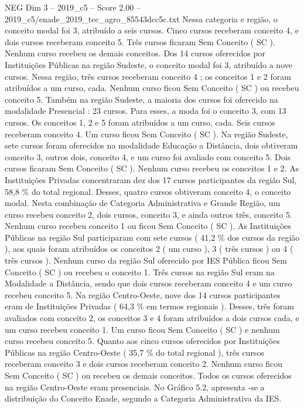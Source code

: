 \begin{textsample}{NEG Dim 3 – 2019\_c5 – Score 2.00 – 2019\_c5/enade\_2019\_tec\_agro\_85543dcc5c.txt}
Nessa categoria e região, o conceito modal foi 3, atribuído a seis cursos.
Cinco cursos receberam conceito 4, e dois cursos receberam conceito 5.
Três cursos ficaram Sem Conceito ( SC ).
Nenhum curso recebeu os demais conceitos.
Dos 14 cursos oferecidos por Instituições Públicas na região Sudeste, o conceito modal foi 3, atribuído a nove cursos.
Nessa região, três cursos receberam conceito 4 ; os conceitos 1 e 2 foram atribuídos a um curso, cada.
Nenhum curso ficou Sem Conceito ( SC ) ou recebeu conceito 5.
Também na região Sudeste, a maioria dos cursos foi oferecido na modalidade Presencial : 23 cursos.
Para esses, a moda foi o conceito 3, com 13 cursos.
Os conceitos 1, 2 e 5 foram atribuídos a um curso, cada.
Seis cursos receberam conceito 4.
Um curso ficou Sem Conceito ( SC ).
Na região Sudeste, sete cursos foram oferecidos na modalidade Educação a Distância, dois obtiveram conceito 3, outros dois, conceito 4, e um curso foi avaliado com conceito 5.
Dois cursos ficaram Sem Conceito ( SC ).
Nenhum curso recebeu os conceitos 1 e 2.
As Instituições Privadas concentraram dez dos 17 cursos participantes da região Sul, 58,8 \% do total regional.
Desses, quatro cursos obtiveram conceito 4, o conceito modal.
Nesta combinação de Categoria Administrativa e Grande Região, um curso recebeu conceito 2, dois cursos, conceito 3, e ainda outros três, conceito 5.
Nenhum curso recebeu conceito 1 ou ficou Sem Conceito ( SC ).
As Instituições Públicas na região Sul participaram com sete cursos ( 41,2 \% dos cursos da região ), aos quais foram atribuídos os conceitos 2 ( um curso ), 3 ( três cursos ) ou 4 ( três cursos ).
Nenhum curso da região Sul oferecido por IES Pública ficou Sem Conceito ( SC ) ou recebeu o conceito 1.
Três cursos na região Sul eram na Modalidade a Distância, sendo que dois cursos receberam conceito 4 e um curso recebeu conceito 5.
Na região Centro-Oeste, nove dos 14 cursos participantes eram de Instituições Privadas ( 64,3 \% em termos regionais ).
Desses, três foram avaliados com conceito 2, os conceitos 3 e 4 foram atribuídos a dois cursos cada, e um curso recebeu conceito 1.
Um curso ficou Sem Conceito ( SC ) e nenhum curso recebeu conceito 5.
Quanto aos cinco cursos oferecidos por Instituições Públicas na região Centro-Oeste ( 35,7 \% do total regional ), três cursos receberam conceito 3 e dois cursos receberam conceito 2.
Nenhum curso ficou Sem Conceito ( SC ) ou recebeu os demais conceitos.
Todos os cursos oferecidos na região Centro-Oeste eram presenciais.
No Gráfico 5.2, apresenta -se a distribuição do Conceito Enade, segundo a Categoria Administrativa da IES.

\end{textsample}
